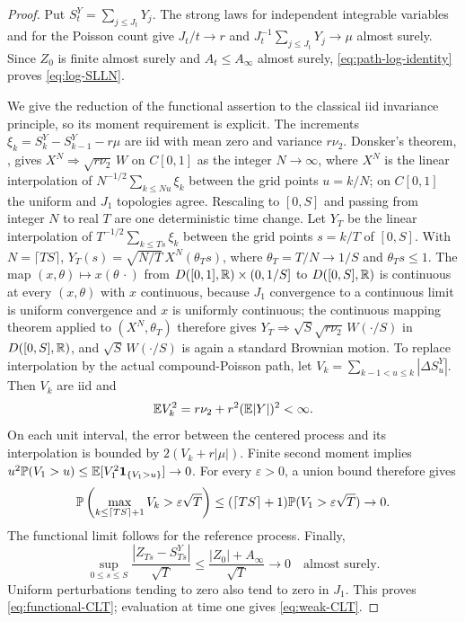 \begin{proof}
Put $S_t^Y=\sum_{j\leq J_t}Y_j$. The strong laws for independent
integrable variables and for the Poisson count give
$J_t/t\to r$ and $J_t^{-1}\sum_{j\leq J_t}Y_j\to\mu$ almost
surely. Since $Z_0$ is finite almost surely and $A_t\leq A_\infty$
almost surely, \eqref{eq:path-log-identity} proves \eqref{eq:log-SLLN}.

We give the reduction of the functional assertion to the classical
iid invariance principle, so its moment requirement is explicit.
The increments $\xi_k=S_k^Y-S_{k-1}^Y-r\mu$ are iid with mean zero
and variance $r\nu_2$. Donsker's theorem,
\citet[Theorem~8.2]{Billingsley1999}, gives
$X^N\Rightarrow\sqrt{r\nu_2}\,W$ on $C[0,1]$ as the integer
$N\to\infty$, where $X^N$ is the linear interpolation of
$N^{-1/2}\sum_{k\leq Nu}\xi_k$ between the grid points $u=k/N$; on
$C[0,1]$ the uniform and $J_1$ topologies agree. Rescaling to
$[0,S]$ and passing from integer $N$ to real $T$ are one deterministic
time change. Let $Y_T$ be the linear interpolation of
$T^{-1/2}\sum_{k\leq Ts}\xi_k$ between the grid points $s=k/T$ of
$[0,S]$. With $N=\lceil TS\rceil$,
$Y_T(s)=\sqrt{N/T}\,X^N(\theta_Ts)$, where $\theta_T=T/N\to1/S$ and
$\theta_Ts\leq1$. The map $(x,\theta)\mapsto x(\theta\,\cdot)$ from
$D([0,1],\mathbb R)\times(0,1/S]$ to $D([0,S],\mathbb R)$ is continuous at every
$(x,\theta)$ with $x$ continuous, because $J_1$ convergence to a
continuous limit is uniform convergence and $x$ is uniformly
continuous; the continuous mapping theorem applied to
$(X^N,\theta_T)$ therefore gives
$Y_T\Rightarrow\sqrt S\sqrt{r\nu_2}\,W(\cdot/S)$ in $D([0,S],\mathbb R)$,
and $\sqrt S\,W(\cdot/S)$ is again a standard Brownian motion.
To replace interpolation by the actual compound-Poisson path, let
$V_k=\sum_{k-1<u\leq k}|\Delta S_u^Y|$. Then $V_k$ are iid and
\[
 \mathbb E V_k^2=r\nu_2+r^2(\mathbb E|Y|)^2<\infty.
\]
On each unit interval, the error between the centered process and
its interpolation is bounded by $2(V_k+r|\mu|)$.
Finite second moment implies
$u^2\mathbb P(V_1>u)\leq\mathbb E[V_1^2\mathbf 1_{\{V_1>u\}}]\to0$.
For every $\varepsilon>0$, a union bound therefore gives
\[
 \mathbb P\left(\max_{k\leq\lceil TS\rceil+1}V_k>
                                      \varepsilon\sqrt T\right)
 \leq(\lceil TS\rceil+1)\mathbb P(V_1>\varepsilon\sqrt T)\to0.
\]
The functional limit follows for the reference process.
Finally,
\begin{equation}
 \sup_{0\leq s\leq S}
 \frac{|Z_{Ts}-S_{Ts}^Y|}{\sqrt T}
 \leq\frac{|Z_0|+A_\infty}{\sqrt T}\to0
 \quad\text{almost surely}.
 \label{eq:uniform-transfer}
\end{equation}
Uniform perturbations tending to zero also tend to zero in $J_1$.
This proves \eqref{eq:functional-CLT}; evaluation at time one gives
\eqref{eq:weak-CLT}.


\end{proof}
